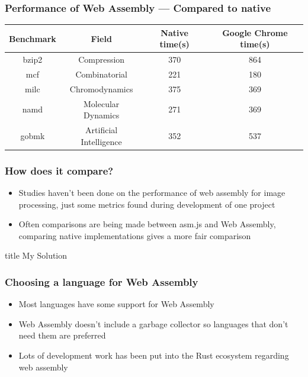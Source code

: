 \documentclass{beamer}
\begin{document}
\begin{frame}
    \frametitle{Performance of Web Assembly — Compared to native \cite{jangda2019not}}

    {\small
        \begin{table}[H]
            \centering
            \vspace*{6pt}
            \label{native}
            \begin{tabular}{cccc}\hline\hline
                Benchmark & Field                   & Native time(s) & Google Chrome time(s) \\ \hline
                bzip2     & Compression             & 370            & 864                   \\
                mcf       & Combinatorial           & 221            & 180                   \\
                milc      & Chromodynamics          & 375            & 369                   \\
                namd      & Molecular Dynamics      & 271            & 369                   \\
                gobmk     & Artificial Intelligence & 352            & 537
            \end{tabular}
        \end{table}
    }
\end{frame}

\begin{frame}
    \frametitle{How does it compare?}
    \begin{itemize}
        \item Studies haven't been done on the performance of web assembly for image processing, just some metrics found during development of one project
        \item Often comparisons are being made between asm.js and Web Assembly, comparing native implementations gives a more fair comparison
    \end{itemize}
\end{frame}

\begin{frame}
    \vfill
    \centering
    \begin{beamercolorbox}[sep=8pt,center,shadow=true,rounded=true]{title}
         My Solution\par%
    \end{beamercolorbox}
    \vfill
\end{frame}

\begin{frame}
    \frametitle{Choosing a language for Web Assembly}
    \begin{itemize}
        \item Most languages have some support for Web Assembly
        \item Web Assembly doesn't include a garbage collector so languages that don't need them are preferred
        \item Lots of development work has been put into the Rust ecosystem regarding web assembly
    \end{itemize}


\end{frame}
\end{document}

